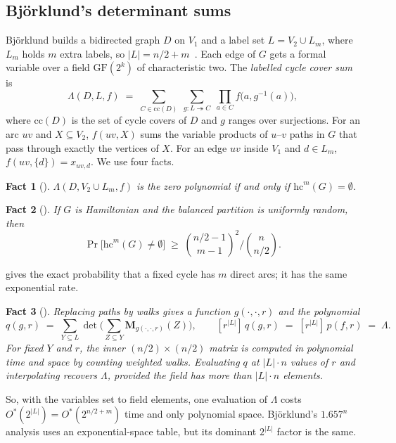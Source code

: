 \documentclass[11pt,a4paper]{article}
\theoremstyle{plain}
\newtheorem{fact}{Fact}
\theoremstyle{remark}
\newcommand{\Ostar}{O^{*}}
\newcommand{\hc}{\mathrm{hc}}
\newcommand{\GF}{\mathrm{GF}}
\begin{document}
\subsection{Björklund's determinant sums}

Björklund builds a bidirected graph $D$ on $V_1$ and a label set $L = V_2 \cup L_m$, where $L_m$ holds $m$ extra labels, so $|L| = n/2 + m$~\cite[\S 3.2]{bjorklund}. Each edge of $G$ gets a formal variable over a field $\GF(2^k)$ of characteristic two. The \emph{labelled cycle cover sum} is
\[
  \Lambda(D, L, f) \;=\; \sum_{C \in \mathrm{cc}(D)} \;\sum_{g\colon L \twoheadrightarrow C} \;\prod_{a \in C} f\big(a, g^{-1}(a)\big),
\]
where $\mathrm{cc}(D)$ is the set of cycle covers of $D$ and $g$ ranges over surjections. For an arc $uv$ and $X \subseteq V_2$, $f(uv, X)$ sums the variable products of $u$--$v$ paths in $G$ that pass through exactly the vertices of $X$. For an edge $uv$ inside $V_1$ and $d \in L_m$, $f(uv,\{d\}) = x_{uv,d}$. We use four facts.

\begin{fact}[{\cite[Lemma 9]{bjorklund}}]\label{fact:zero}
$\Lambda(D, V_2 \cup L_m, f)$ is the zero polynomial if and only if $\hc^m(G) = \emptyset$.
\end{fact}

\begin{fact}[{\cite[Lemma 10]{bjorklund}}]\label{fact:prob}
If $G$ is Hamiltonian and the balanced partition is uniformly random, then
\[
  \Pr\big[\hc^m(G) \neq \emptyset\big] \;\ge\; \binom{n/2-1}{m-1}^{\!2} \Big/ \binom{n}{n/2}.
\]
\end{fact}
\noindent
{} gives the exact probability that a fixed cycle has $m$ direct arcs; it has the same exponential rate.

\begin{fact}[{\cite[\S 4 and Lemma 11]{bjorklund}}]\label{fact:space}
Replacing paths by walks gives a function $g(\cdot,\cdot,r)$ and the polynomial
\[
  q(g, r) \;=\; \sum_{Y \subseteq L} \det\Big(\sum_{Z \subseteq Y} \mathbf{M}_{g(\cdot,\cdot,r)}(Z)\Big),
  \qquad
  [r^{|L|}]\, q(g,r) \;=\; [r^{|L|}]\, p(f,r) \;=\; \Lambda .
\]
For fixed $Y$ and $r$, the inner $(n/2)\times(n/2)$ matrix is computed in polynomial time and space by counting weighted walks. Evaluating $q$ at $|L|\cdot n$ values of $r$ and interpolating recovers $\Lambda$, provided the field has more than $|L|\cdot n$ elements.
\end{fact}
\noindent
So, with the variables set to field elements, one evaluation of $\Lambda$ costs $\Ostar(2^{|L|}) = \Ostar(2^{n/2+m})$ time and only polynomial space. Björklund's $1.657^n$ analysis uses an exponential-space table, but its dominant $2^{|L|}$ factor is the same.
\end{document}
